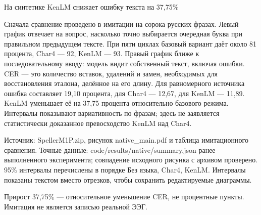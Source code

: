 \documentclass[10pt,aspectratio=169]{beamer}
\begin{document}
\begin{frame}[t]{На синтетике KenLM снижает ошибку текста на 37,75\%}
{Сначала сравнение проведено в имитации на сорока русских фразах. Левый график отвечает на вопрос, насколько точно выбирается очередная буква при правильном предыдущем тексте. При пяти циклах базовый вариант даёт около 81 процента, Char4 — 92, KenLM — 93. Правый график ближе к последовательному вводу: модель видит собственный текст, включая ошибки. CER — это количество вставок, удалений и замен, необходимых для восстановления эталона, делённое на его длину. Для равномерного источника ошибка составляет 19,10 процента, для Char4 — 12,67, для KenLM — 11,89. KenLM уменьшает её на 37,75 процента относительно базового режима. Интервалы показывают вариативность по фразам; здесь не заявляется статистически доказанное превосходство KenLM над Char4.

Источник: SpellerM1P.zip, рисунок native\_main.pdf и таблица имитационного сравнения. Точные данные: code/results/native/summary.json ранее выполненного эксперимента; совпадение исходного рисунка с архивом проверено. 95\% интервалы перечислены в порядке Без языка, Char4, KenLM. Интервалы показаны текстом вместо отрезков, чтобы сохранить редактируемые диаграммы.

Прирост 37,75\% — относительное уменьшение CER, не процентные пункты. Имитация не является записью реальной ЭЭГ.}
\end{frame}
\end{document}
